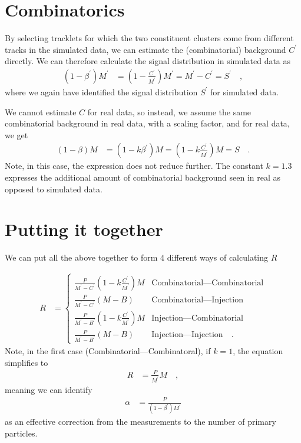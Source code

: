 \documentclass{article}
\begin{document}
\section{Combinatorics}

By selecting tracklets for which the two constituent clusters come
from different tracks in the simulated data, we can estimate the
(combinatorial) background $C^\prime$ directly.  We can therefore calculate
the signal distribution in simulated data as 
\begin{align}
  \label{eq:betaCMC}
  (1-\beta^\prime)M^\prime 
  &= \left(1-\frac{C^\prime}{M^\prime}\right)M^\prime =
    M^\prime - C^\prime = S^\prime\quad,
\end{align}
where we again have identified the signal distribution $S^\prime$ for
simulated data. 

We cannot estimate $C$ for real data, so instead, we assume the same
combinatorial background in real data, with a scaling factor, and for
real data, we get 
\begin{align}
  \label{eq:betaC}
  (1-\beta)M 
  &= (1-k\beta^\prime)M 
    = \left(1-k\frac{C^\prime}{M^\prime}\right)M = S\quad.
\end{align}
Note, in this case, the expression does not reduce further.  The
constant $k=1.3$ expresses the additional amount of combinatorial
background seen in real as opposed to simulated data. 

\section{Putting it together} 

We can put all the above together to form 4 different ways of
calculating $R$ 

\begin{align}
  \label{eq:methods}
  R &=
      \begin{cases}
        \frac{P}{M^\prime-C^\prime}\left(1-k\frac{C^\prime}{M^\prime}\right)M 
        & \text{Combinatorial---Combinatorial}\\
        \frac{P}{M^\prime-C^\prime}(M-B) 
        & \text{Combinatorial---Injection}\\
        \frac{P}{M^\prime-B^\prime}\left(1-k\frac{C^\prime}{M^\prime}\right)M 
        & \text{Injection---Combinatorial}\\
        \frac{P}{M^\prime-B^\prime}(M-B)
        & \text{Injection---Injection}\quad.
      \end{cases}
\end{align}
Note, in the first case (Combinatorial---Combinatoral), if $k=1$, the
equation simplifies to 
\begin{align*}
  R &= \frac{P}{M^\prime}M\quad,
\end{align*}
meaning we can identify 
\begin{align}
  \label{eq:alpha}
  \alpha &= \frac{P}{(1-\beta^\prime)M^\prime}
\end{align}
as an effective correction from the measurements to the number of
primary particles. 
\end{document}
